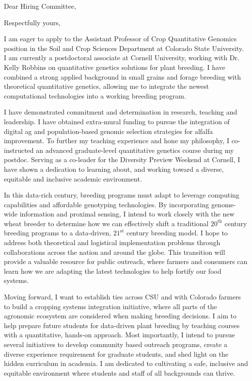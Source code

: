 \documentclass[11pt, letterpaper]{moderncv}
\begin{document}
\date{\today}
\opening{Dear Hiring Committee,}
\closing{Respectfully yours,}
\makelettertitle

I am eager to apply to the Assistant Professor of Crop Quantitative Genomics position in the Soil and Crop Sciences Department at Colorado State University. I am currently a postdoctoral associate at Cornell University, working with Dr. Kelly Robbins on quantitative genetics solutions for plant breeding. I have combined a strong applied background in small grains and forage breeding with theoretical quantitative genetics, allowing me to integrate the newest computational technologies into a working breeding program.

I have demonstrated commitment and determination in research, teaching and leadership. I have obtained extra-mural funding to pursue the integration of digital ag and population-based genomic selection strategies for alfalfa improvement. To further my teaching experience and hone my philosophy, I co-instructed an advanced graduate-level quantitative genetics course during my postdoc. Serving as a co-leader for the Diversity Preview Weekend at Cornell, I have shown a dedication to learning about, and working toward a diverse, equitable and inclusive academic environment. 

In this data-rich century, breeding programs must adapt to leverage computing capabilities and affordable genotyping technologies. By incorporating genome-wide information and proximal sensing, I intend to work closely with the new wheat breeder to determine how we can effectively shift a traditional $20^\text{th}$ century breeding programs to a data-driven, $21^\text{st}$ century breeding model. I hope to address both theoretical and logistical implementation problems through collaborations across the nation and around the globe. This transition will provide a valuable resource for public outreach, where farmers and consumers can learn how we are adapting the latest technologies to help fortify our food systems.

Moving forward, I want to establish ties across CSU and with Colorado farmers to build a cropping systems integration initiative, where all parts of the agronomic ecosystem are considered when making breeding decisions. I aim to help prepare future students for data-driven plant breeding by teaching courses with a quantitative, hands-on approach. Most importantly, I intend to pursue several initiatives to develop community based outreach programs, create a diverse experience requirement for graduate students, and shed light on the hidden curriculum in academia. I am dedicated to cultivating a safe, inclusive and equitable environment where students and staff of all backgrounds can thrive. 
\end{document}
